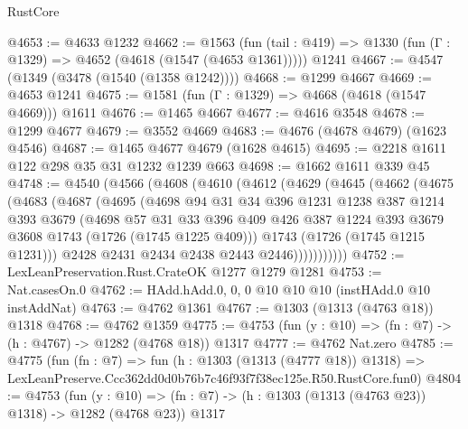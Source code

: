 \begin{lexlean}{RustCore}
\begin{coremodule}
@4653 := @4633 @1232
@4662 := @1563
    (fun (tail : @419) => @1330 (fun (Γ : @1329) => @4652 (@4618 (@1547 (@4653 @1361)))))
    @1241
@4667 := @4547 (@1349 (@3478 (@1540 (@1358 @1242))))
@4668 := @1299 @4667
@4669 := @4653 @1241
@4675 := @1581 (fun (Γ : @1329) => @4668 (@4618 (@1547 @4669))) @1611
@4676 := @1465 @4667
@4677 := @4616 @3548
@4678 := @1299 @4677
@4679 := @3552 @4669
@4683 := @4676 (@4678 @4679) (@1623 @4546)
@4687 := @1465 @4677 @4679 (@1628 @4615)
@4695 := @2218 @1611 @122 @298 @35 @31 @1232 @1239 @663
@4698 := @1662 @1611 @339 @45
@4748 := @4540
    (@4566
      (@4608
        (@4610
          (@4612
            (@4629
              (@4645
                (@4662
                  (@4675
                    (@4683
                      (@4687
                        (@4695
                          (@4698
                            @94
                            @31
                            @34
                            @396
                            @1231
                            @1238
                            @387
                            @1214
                            @393
                            @3679
                            (@4698
                              @57
                              @31
                              @33
                              @396
                              @409
                              @426
                              @387
                              @1224
                              @393
                              @3679
                              @3608
                              @1743
                              (@1726 (@1745 @1225 @409)))
                            @1743
                            (@1726 (@1745 @1215 @1231)))
                          @2428
                          @2431
                          @2434
                          @2438
                          @2443
                          @2446)))))))))))
@4752 := LexLeanPreservation.Rust.CrateOK @1277 @1279 @1281
@4753 := Nat.casesOn.{0}
@4762 := HAdd.hAdd.{0, 0, 0} @10 @10 @10 (instHAdd.{0} @10 instAddNat)
@4763 := @4762 @1361
@4767 := @1303 (@1313 (@4763 @18)) @1318
@4768 := @4762 @1359
@4775 := @4753 (fun (y : @10) => (fn : @7) -> (h : @4767) -> @1282 (@4768 @18)) @1317
@4777 := @4762 Nat.zero
@4785 := @4775
    (fun (fn : @7) =>
    fun (h : @1303 (@1313 (@4777 @18)) @1318) =>
    LexLeanPreserve.Ccc362dd0d0b76b7c46f93f7f38ec125e.R50.RustCore.fun0)
@4804 := @4753
    (fun (y : @10) => (fn : @7) -> (h : @1303 (@1313 (@4763 @23)) @1318) -> @1282 (@4768 @23))
    @1317

\end{coremodule}
\end{lexlean}
